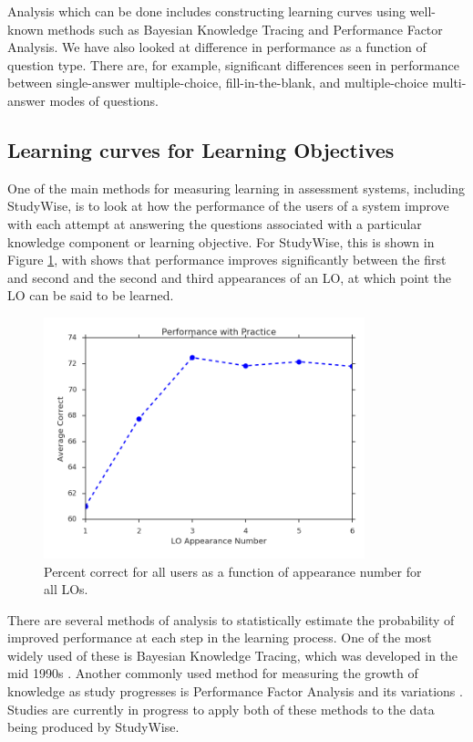 \documentclass[runningheads,a4paper]{llncs}
\begin{document}
Analysis which can be done includes constructing learning curves using well-known methods such as Bayesian Knowledge Tracing and Performance Factor Analysis.  We have also looked at difference in performance as a function of question type.  There are, for example, significant differences seen in performance between single-answer multiple-choice, fill-in-the-blank, and multiple-choice multi-answer modes of questions.

\subsection{Learning curves for Learning Objectives}
One of the main methods for measuring learning in assessment systems, including StudyWise, is to look at how the performance of the users of a system improve with each attempt at answering the questions associated with a particular knowledge component or learning objective.  For StudyWise, this is shown in Figure \ref{fig:Performance}, with shows that performance improves significantly between the first and second and the second and third appearances of an LO, at which point the LO can be said to be learned.

\begin{figure}
\centering
\includegraphics[height=2.75in]{perf_vs_otp}
\caption{Percent correct for all users as a function of appearance number for all LOs.}
\label{fig:Performance}
\end{figure}

There are several methods of analysis to statistically estimate the probability of improved performance at each step in the learning process.  One of the most widely used of these is Bayesian Knowledge Tracing, which was developed in the mid 1990s \cite{CorbettAnderson1995}.  Another commonly used method for measuring the growth of knowledge as study progresses is Performance Factor Analysis and its variations \cite{Pavlik2009}.  Studies are currently in progress to apply both of these methods to the data being produced by StudyWise.
\end{document}
